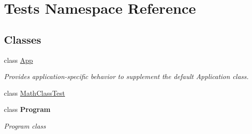 \hypertarget{namespace_tests}{}\section{Tests Namespace Reference}
\label{namespace_tests}
\subsection*{Classes}
\begin{DoxyCompactItemize}
\item 
class \hyperlink{class_tests_1_1_app}{App}
\begin{DoxyCompactList}\small\item\em Provides application-\/specific behavior to supplement the default Application class. \end{DoxyCompactList}\item 
class \hyperlink{class_tests_1_1_math_class_test}{Math\+Class\+Test}
\item 
class {\bfseries Program}
\begin{DoxyCompactList}\small\item\em Program class \end{DoxyCompactList}\end{DoxyCompactItemize}
